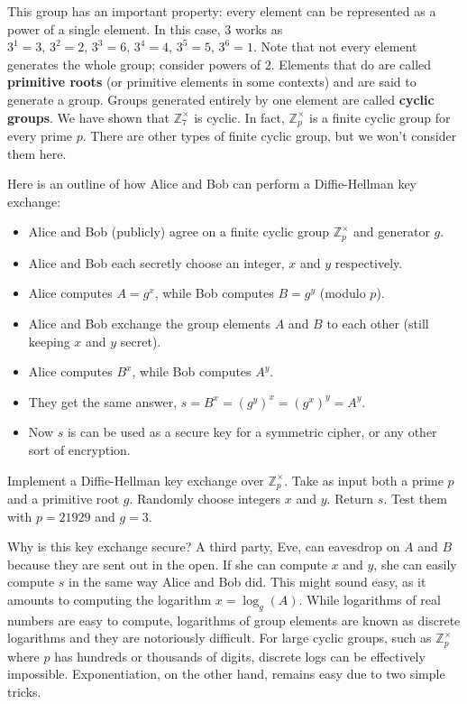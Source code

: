 This group has an important property: every element can be represented as a power of a single element. In this case, $3$ works as $3^1 = 3,\,3^2 = 2,\,3^3 = 6,\,3^4 = 4,\,3^5 = 5,\,3^6 = 1$. Note that not every element generates the whole group; consider powers of $2$. Elements that do are called {\bf primitive roots} (or primitive elements in some contexts) and are said to generate a group. Groups generated entirely by one element are called {\bf cyclic groups}. We have shown that $\mathbb{Z}_7^\times$ is cyclic. In fact, $\mathbb{Z}_p^\times$ is a finite cyclic group for every prime $p$. There are other types of finite cyclic group, but we won't consider them here.

Here is an outline of how Alice and Bob can perform a Diffie-Hellman key exchange:

\begin{itemize}[$\bullet$]

\item Alice and Bob (publicly) agree on a finite cyclic group $\mathbb{Z}_p^\times$ and generator $g$.

\item Alice and Bob each secretly choose an integer, $x$ and $y$ respectively.

\item Alice computes $A = g^x$, while Bob computes $B = g^y$ (modulo $p$).

\item Alice and Bob exchange the group elements $A$ and $B$ to each other (still keeping $x$ and $y$ secret).

\item Alice computes $B^x$, while Bob computes $A^y$.

\item They get the same answer, $s = B^x = (g^y)^x = (g^x)^y = A^y$. 

\item Now $s$ is can be used as a secure key for a symmetric cipher, or any other sort of encryption.

\end{itemize}


\begin{problem}
Implement a Diffie-Hellman key exchange over $\mathbb{Z}_p^\times$. Take as input both a prime $p$ and a primitive root $g$. Randomly choose integers $x$ and $y$. Return $s$. Test them with $p = 21929$ and $g=3$.
\end{problem}

Why is this key exchange secure? A third party, Eve, can eavesdrop on $A$ and $B$ because they are sent out in the open. If she can compute $x$ and $y$, she can easily compute $s$ in the same way Alice and Bob did. This might sound easy, as it amounts to computing the logarithm $x = \log_g(A)$. While logarithms of real numbers are easy to compute, logarithms of group elements are known as discrete logarithms and they are notoriously difficult. For large cyclic groups, such as $\mathbb{Z}_p^\times$ where $p$ has hundreds or thousands of digits, discrete logs can be effectively impossible. Exponentiation, on the other hand, remains easy due to two simple tricks.

